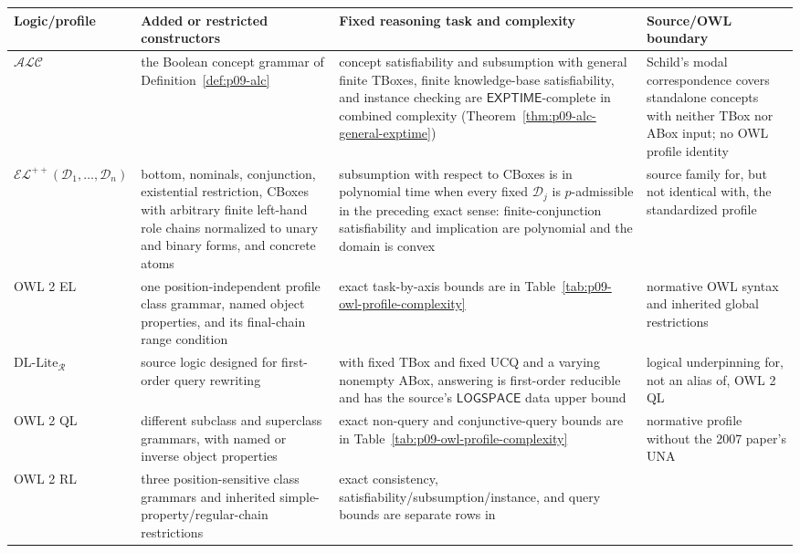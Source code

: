 \begin{table}[htbp]
\centering\scriptsize
\begin{tabularx}{\textwidth}{@{}l X X X@{}}
\toprule
Logic/profile & Added or restricted constructors & Fixed reasoning task and
complexity & Source/OWL boundary \\
\midrule
\(\mathcal{ALC}\) & the Boolean concept grammar of
Definition~\ref{def:p09-alc} & concept satisfiability and subsumption with
general finite TBoxes, finite knowledge-base satisfiability, and instance
checking are \(\mathsf{EXPTIME}\)-complete in combined complexity
(Theorem~\ref{thm:p09-alc-general-exptime}) &
  Schild's modal correspondence covers standalone concepts with neither TBox
  nor ABox input; no OWL profile identity
  \cite{Schild1991,BaaderHorrocksSattler2008} \\
\(\mathcal{EL}^{++}(\mathcal D_1,\ldots,\mathcal D_n)\) & bottom, nominals,
conjunction, existential restriction, CBoxes with arbitrary finite left-hand
role chains normalized to unary and binary forms, and concrete atoms &
subsumption with respect to CBoxes is in
polynomial time when every fixed \(\mathcal D_j\) is \(p\)-admissible in the
preceding exact sense: finite-conjunction satisfiability and implication are
polynomial and the domain is convex & source family for, but not identical
with, the standardized profile \cite{BaaderBrandtLutz2005} \\
OWL 2 EL & one position-independent profile class grammar, named object
properties, and its final-chain range condition & exact task-by-axis bounds are
in Table~\ref{tab:p09-owl-profile-complexity} & normative OWL syntax and
inherited global restrictions \cite{W3COWL2Profiles2012} \\
\(\mathrm{DL\mbox{-}Lite}_{\mathcal R}\) & source logic designed for
first-order query rewriting & with fixed TBox and fixed UCQ and a varying
nonempty ABox, answering is first-order reducible and has the source's
\(\mathsf{LOGSPACE}\) data upper bound & logical underpinning for, not an alias of, OWL 2 QL
\cite{CalvaneseEtAl2007} \\
OWL 2 QL & different subclass and superclass grammars, with named or inverse
object properties & exact non-query and conjunctive-query bounds are in
Table~\ref{tab:p09-owl-profile-complexity} & normative profile without the
2007 paper's UNA \cite{W3COWL2Profiles2012} \\
OWL 2 RL & three position-sensitive class grammars and inherited
simple-property/regular-chain restrictions & exact consistency,
satisfiability/subsumption/instance, and query bounds are separate rows in

\end{tabularx}
\end{table}
